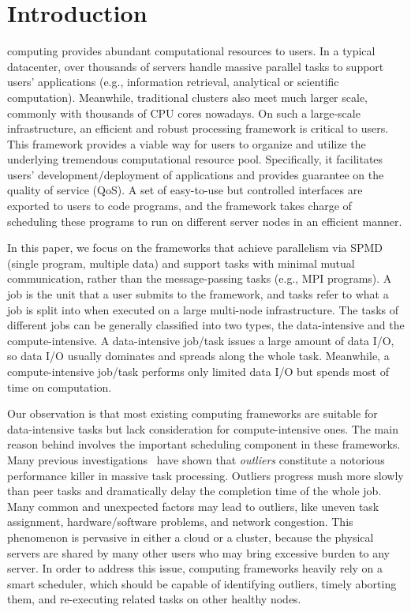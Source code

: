 \section{Introduction}

 computing provides abundant computational resources to users. In a typical datacenter, over thousands of servers handle massive parallel tasks to support users' applications (e.g., information retrieval, analytical or scientific computation). Meanwhile, traditional clusters also meet much larger scale, commonly with thousands of CPU cores nowadays. On such a large-scale infrastructure, an efficient and robust processing framework is critical to users. This framework provides a viable way for users to organize and utilize the underlying tremendous computational resource pool. Specifically, it facilitates users' development/deployment of applications and provides guarantee on the quality of service (QoS). A set of easy-to-use but controlled interfaces are exported to users to code programs, and the framework takes charge of scheduling these programs to run on different server nodes in an efficient manner.

In this paper, we focus on the frameworks that achieve parallelism via SPMD (single program, multiple data) and support tasks with minimal mutual communication, rather than the message-passing tasks (e.g., MPI programs). A job is the unit that a user submits to the framework, and tasks refer to what a job is split into when executed on a large multi-node infrastructure. The tasks of different jobs can be generally classified into two types, the data-intensive and the compute-intensive. A data-intensive job/task issues a large amount of data I/O, so data I/O usually dominates and spreads along the whole task. Meanwhile, a compute-intensive job/task performs only limited data I/O but spends most of time on computation.

Our observation is that most existing computing frameworks are suitable for data-intensive tasks but lack consideration for compute-intensive ones. The main reason behind involves the important scheduling component in these frameworks. Many previous investigations~\cite{Zaharia:2008:IMP:1855741.1855744, Ananthanarayanan:2010:ROM:1924943.1924962} have shown that \textit{outliers} constitute a notorious performance killer in massive task processing. Outliers progress mush more slowly than peer tasks and dramatically delay the completion time of the whole job. Many common and unexpected factors may lead to outliers, like uneven task assignment, hardware/software problems, and network congestion. This phenomenon is pervasive in either a cloud or a cluster, because the physical servers are shared by many other users who may bring excessive burden to any server. In order to address this issue, computing frameworks heavily rely on a smart scheduler, which should be capable of identifying outliers, timely aborting them, and re-executing related tasks on other healthy nodes.


